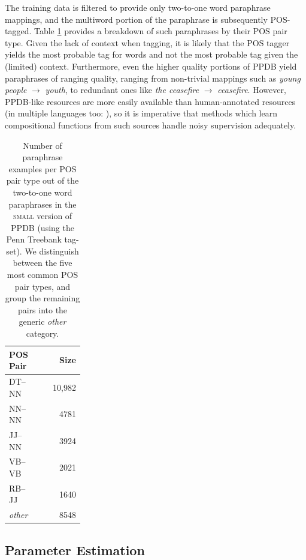 \documentclass[11pt]{article}
\begin{document}
The training data is filtered to provide only two-to-one word paraphrase mappings, and the multiword portion of the paraphrase is subsequently POS-tagged.
Table \ref{tab:pos-stats} provides a breakdown of such paraphrases by their POS pair type.  
Given the lack of context when tagging, it is likely that the POS tagger yields the most probable tag for words and not the most probable tag given the (limited) context. 
Furthermore, even the higher quality portions of PPDB yield paraphrases of ranging quality, ranging from non-trivial mappings such as \emph{young people} $\rightarrow$ \emph{youth}, to redundant ones like \emph{the ceasefire} $\rightarrow$ \emph{ceasefire}. 
However, PPDB-like resources are more easily available than human-annotated resources (in multiple languages too: ), so it is imperative that methods which learn compositional functions from such sources handle noisy supervision adequately. 

\begin{table}[h!]
  \begin{center}
    \begin{tabular}{p{0.25\linewidth}r}
      \hline
      POS Pair & Size \\
	  \hline
      DT--NN & 10,982 \\
	  NN--NN &  4781 \\
	  JJ--NN & 3924 \\
  	  VB--VB  &  2021 \\
      RB--JJ &  1640 \\
	  \emph{other}  & 8548 \\
	\end{tabular}
  \end{center}
  \caption{Number of paraphrase examples per POS pair type out of the two-to-one word paraphrases in the \textsc{small} version of PPDB (using the Penn Treebank tag-set). We distinguish between the five most common POS pair types, and group the remaining pairs into the generic \emph{other} category.}
  \label{tab:pos-stats}
\end{table}

\subsection{Parameter Estimation}
\end{document}
